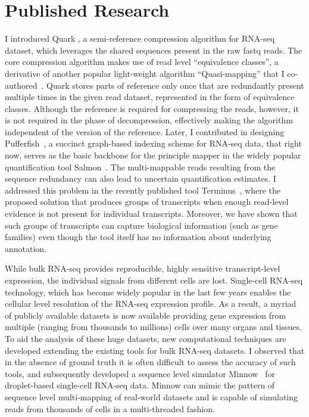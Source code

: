 \documentclass[11pt,a4paper,sans]{moderncv}        %
\begin{document}
\section{Published Research}
\setlength{\parindent}{5ex} 
 I introduced Quark \cite{quark}, a semi-reference compression algorithm for RNA-seq dataset, which leverages the shared sequences present in the raw fastq reads. The core compression algorithm makes use of read level ``equivalence classes'', a derivative of another popular light-weight algorithm ``Quasi-mapping'' that I co-authored~\cite{rapmap}. Quark stores parts of reference only once that are redundantly present multiple times in the given read dataset, represented in the form of equivalence classes. Although the reference is required for compressing the reads, however, it is not required in the phase of decompression, effectively making the algorithm independent of the version of the reference. Later, I contributed in designing Pufferfish~\cite{pufferfish}, a succinct graph-based indexing scheme for RNA-seq data, that right now, serves as the basic backbone for the principle mapper in the widely popular quantification tool Salmon~\cite{salmon}. The multi-mappable reads resulting from the sequence redundancy can also lead to uncertain quantification estimates. I addressed this problem in the recently published tool Terminus~\cite{terminus}, where the proposed solution that produces groups of transcripts when enough read-level evidence is not present for individual transcripts. Moreover, we have shown that such groups of transcripts can capture biological information (such as gene families) even though the tool itself has no information about underlying annotation.

\setlength{\parindent}{5ex}
While bulk RNA-seq provides reproducible, highly sensitive transcript-level expression, the individual signals from different cells are lost. Single-cell RNA-seq technology, which has become widely popular in the last few years enables the cellular level resolution of the RNA-seq expression profile. As a result, a myriad of publicly available datasets is now available providing gene expression from multiple (ranging from thousands to millions) cells over many organs and tissues. To aid the analysis of these huge datasets, new computational techniques are developed extending the existing tools for bulk RNA-seq datasets. I observed that in the absence of ground truth it is often difficult to assess the accuracy of such tools, and subsequently developed a sequence level simulator Minnow~\cite{minnow} for droplet-based single-cell RNA-seq data. Minnow can mimic the pattern of sequence level multi-mapping of real-world datasets and is capable of simulating reads from thousands of cells in a multi-threaded fashion.
\end{document}
